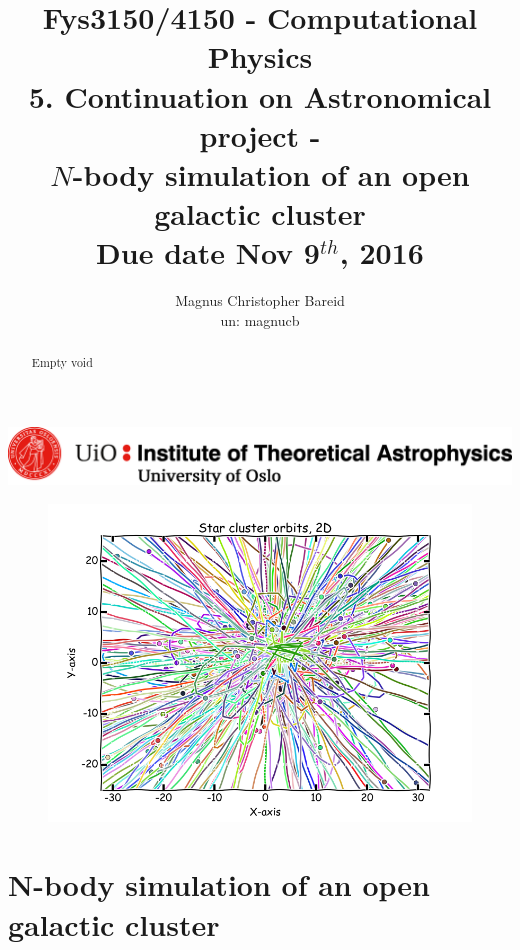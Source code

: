 \documentclass[11pt,a4paper,notitlepage,twocolumn]{article}
\title{\normalsize Fys3150/4150 - Computational Physics\\
\vspace{10mm}
\huge 5. Continuation on Astronomical project -\\ $N$-body simulation of an open galactic cluster\\
\vspace{10mm}
\normalsize Due date {\bf Nov 9$^{th}$, 2016}}
\author{Magnus Christopher Bareid \\ un: magnucb }
\begin{document}
\vspace{5mm}

\begin{titlingpage}
	\begin{center}
    	\includegraphics[scale=0.5]{../ITA_seal.png}
    	\let\newpage\relax\maketitle

		\begin{figure}[H]
		\center
		\includegraphics[scale=0.5]{../figs/frontpage.png}
		\end{figure}

		\begin{abstract}
Empty void %
		\end{abstract}

		\newpage
		\tableofcontents

	\end{center}
\end{titlingpage}



\newpage

\section*{N-body simulation of an open galactic cluster}
\end{document}
